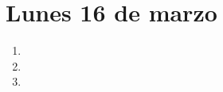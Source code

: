 \documentclass[11pt,spanish]{article}
\begin{document}
  \thispagestyle{empty}
  \section*{Lunes 16 de marzo}

  \begin{enumerate}[font=\Large\bfseries]
    \item
      
    \item
      
    \item
      
  \end{enumerate}
\end{document}
